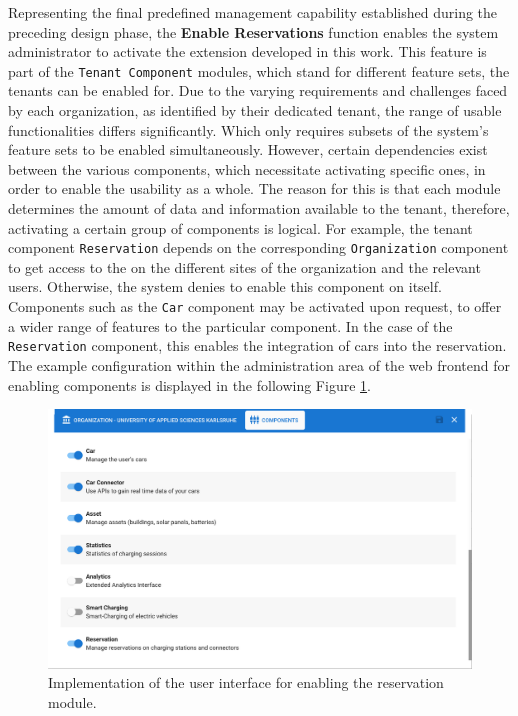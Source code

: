 Representing the final predefined management capability established during the preceding design phase, the \textbf{Enable Reservations} function enables the system administrator to activate the extension developed in this work.
This feature is part of the \texttt{Tenant Component} modules, which stand for different feature sets, the tenants can be enabled for.  
Due to the varying requirements and challenges faced by each organization, as identified by their dedicated tenant, the range of usable functionalities differs significantly. Which only requires subsets of the system's feature sets to be enabled simultaneously.
However, certain dependencies exist between the various components, which necessitate activating specific ones, in order to enable the usability as a whole. The reason for this is that each module determines the amount of data and information available to the tenant, therefore, activating a certain group of components is logical.
For example, the tenant component \texttt{Reservation} depends on the corresponding \texttt{Organization} component to get access to the  on the different sites of the organization and the relevant users. Otherwise, the system denies to enable this component on itself.
Components such as the \texttt{Car} component may be activated upon request, to offer a wider range of features to the particular component. In the case of the \texttt{Reservation} component, this enables the integration of cars into the reservation.
The example configuration within the administration area of the web frontend for enabling components is displayed in the following Figure \ref{fig:enable-reservation-impl}.

\begin{figure}[h]
    \centering
    \includegraphics[scale=0.3]{resources/images/main/6_implementation/screens/enable_reservations/Reservation_Module.png}
    \caption{Implementation of the user interface for enabling the reservation module.}
    \label{fig:enable-reservation-impl}
\end{figure}

